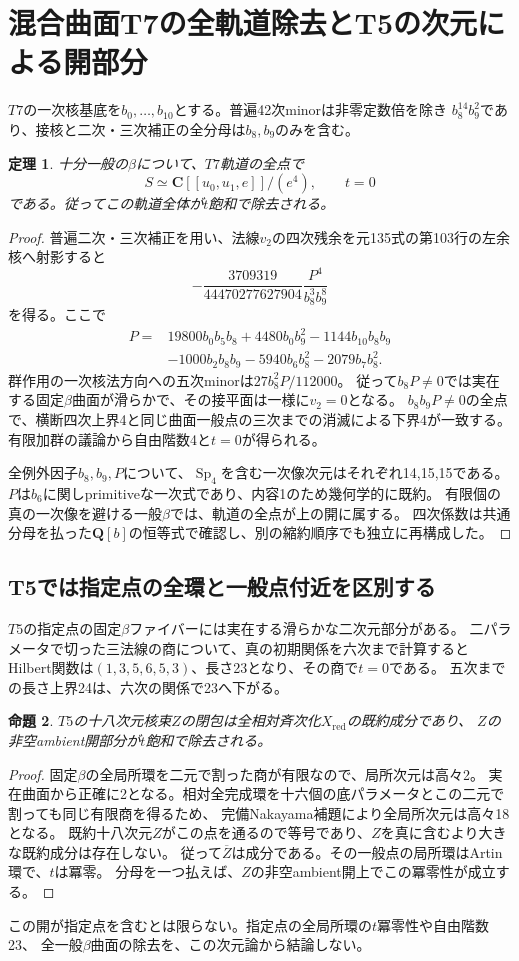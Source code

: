 \documentclass[11pt,a4paper]{ltjsarticle}
\newcommand{\CC}{\mathbf C}
\newcommand{\QQ}{\mathbf Q}
\DeclareMathOperator{\Sp}{Sp}
\newtheorem{theorem}{定理}[section]
\newtheorem{proposition}[theorem]{命題}
\theoremstyle{remark}
\begin{document}
\section{混合曲面T7の全軌道除去とT5の次元による開部分}
$T7$の一次核基底を$b_0,\ldots,b_{10}$とする。普遍42次minorは非零定数倍を除き
$b_8^{14}b_9^2$であり、接核と二次・三次補正の全分母は$b_8,b_9$のみを含む。
\begin{theorem}
十分一般の$\beta$について、$T7$軌道の全点で
\[
 S\simeq\CC[[u_0,u_1,e]]/(e^4),\qquad t=0
\]
である。従ってこの軌道全体が$t$飽和で除去される。
\end{theorem}
\begin{proof}
普遍二次・三次補正を用い、法線$v_2$の四次残余を元135式の第103行の左余核へ射影すると
\[
 -\frac{3709319}{44470277627904}\frac{P^4}{b_8^3b_9^8}
\]
を得る。ここで
\begin{align*}
P={}&19800b_0b_5b_8+4480b_0b_9^2-1144b_{10}b_8b_9\\
&-1000b_2b_8b_9-5940b_6b_8^2-2079b_7b_8^2.
\end{align*}
群作用の一次核法方向への五次minorは$27b_8^2P/112000$。
従って$b_8P\ne0$では実在する固定$\beta$曲面が滑らかで、その接平面は一様に$v_2=0$となる。
$b_8b_9P\ne0$の全点で、横断四次上界4と同じ曲面一般点の三次までの消滅による下界4が一致する。
有限加群の議論から自由階数4と$t=0$が得られる。

全例外因子$b_8,b_9,P$について、$\Sp_4$を含む一次像次元はそれぞれ14,15,15である。
$P$は$b_6$に関しprimitiveな一次式であり、内容1のため幾何学的に既約。
有限個の真の一次像を避ける一般$\beta$では、軌道の全点が上の開に属する。
四次係数は共通分母を払った$\QQ[b]$の恒等式で確認し、別の縮約順序でも独立に再構成した\cite{mixed-t7-exhaust-v40}。
\end{proof}

\subsection{T5では指定点の全環と一般点付近を区別する}
$T5$の指定点の固定$\beta$ファイバーには実在する滑らかな二次元部分がある。
二パラメータで切った三法線の商について、真の初期関係を六次まで計算すると
Hilbert関数は$(1,3,5,6,5,3)$、長さ23となり、その商で$t=0$である。
五次までの長さ上界24は、六次の関係で23へ下がる。

\begin{proposition}
$T5$の十八次元核束$Z$の閉包は全相対斉次化$X_{\mathrm{red}}$の既約成分であり、
$Z$の非空ambient開部分が$t$飽和で除去される。
\end{proposition}
\begin{proof}
固定$\beta$の全局所環を二元で割った商が有限なので、局所次元は高々2。
実在曲面から正確に2となる。相対全完成環を十六個の底パラメータとこの二元で割っても同じ有限商を得るため、
完備Nakayama補題により全局所次元は高々18となる。
既約十八次元$Z$がこの点を通るので等号であり、$Z$を真に含むより大きな既約成分は存在しない。
従って$\overline Z$は成分である。その一般点の局所環はArtin環で、$t$は冪零。
分母を一つ払えば、$Z$の非空ambient開上でこの冪零性が成立する\cite{mixed-t5-open-v40}。
\end{proof}
この開が指定点を含むとは限らない。指定点の全局所環の$t$冪零性や自由階数23、
全一般$\beta$曲面の除去を、この次元論から結論しない。
\end{document}
